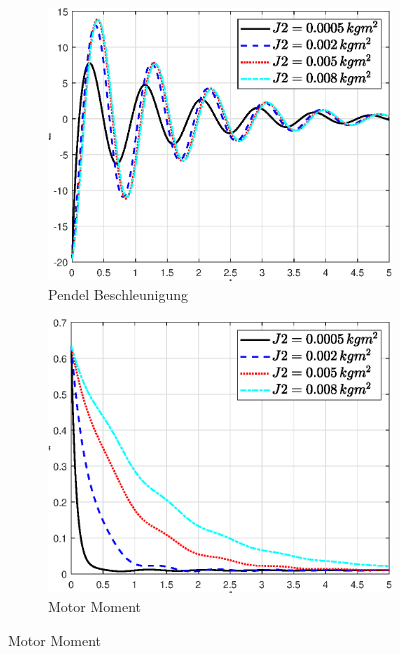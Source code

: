 \begin{figure}
\begin{subfigure}[b]{0.49 \linewidth}
        \label{fig:j2_phi_punkt_punkt}
    \end{subfigure}
    \begin{subfigure}[b]{0.49 \linewidth}
        \includegraphics[width=\linewidth]{plot_data/parameter/fig/j2/theta_punkt_punkt.eps}
        \caption{Pendel Beschleunigung}
        \label{fig:j2_theta_punkt_punkt}
    \end{subfigure}
    \begin{subfigure}[b]{0.49\linewidth}
        \includegraphics[width=\linewidth]{plot_data/parameter/fig/j2/tau.eps}
        \caption{Motor Moment}
        \label{fig:j2_tau}
    \end{subfigure}

\end{figure}
